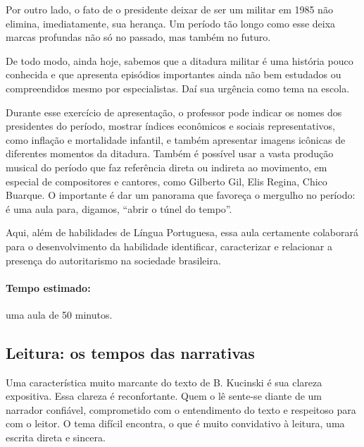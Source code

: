 \documentclass[12pt]{extarticle}
\begin{document}

Por outro lado, o fato de o presidente deixar de ser um militar em 1985
não elimina, imediatamente, sua herança. Um período tão longo como esse
deixa marcas profundas não só no passado, mas também no futuro.

De todo modo, ainda hoje, sabemos que a ditadura militar é uma história
pouco conhecida e que apresenta episódios importantes ainda não bem
estudados ou compreendidos mesmo por especialistas. Daí sua urgência
como tema na escola.

Durante esse exercício de apresentação, o professor pode indicar os
nomes dos presidentes do período, mostrar índices econômicos e sociais
representativos, como inflação e mortalidade infantil, e também
apresentar imagens icônicas de diferentes momentos da ditadura. Também é
possível usar a vasta produção musical do período que faz referência
direta ou indireta ao movimento, em especial de compositores e cantores,
como Gilberto Gil, Elis Regina, Chico Buarque. O importante é dar um
panorama que favoreça o mergulho no período: é uma aula para, digamos,
``abrir o túnel do tempo''.

Aqui, além de habilidades de Língua Portuguesa, essa aula certamente colaborará para o desenvolvimento da habilidade identificar, caracterizar e relacionar a presença do autoritarismo na sociedade brasileira.




\paragraph{Tempo estimado:} uma aula de 50 minutos.

\subsection{Leitura: os tempos das narrativas}

Uma característica muito marcante do texto de B. Kucinski é sua clareza
expositiva. Essa clareza é reconfortante. Quem o lê sente-se diante de
um narrador confiável, comprometido com o entendimento do texto e
respeitoso para com o leitor. O tema difícil encontra, o que é muito
convidativo à leitura, uma escrita direta e sincera.
\end{document}
